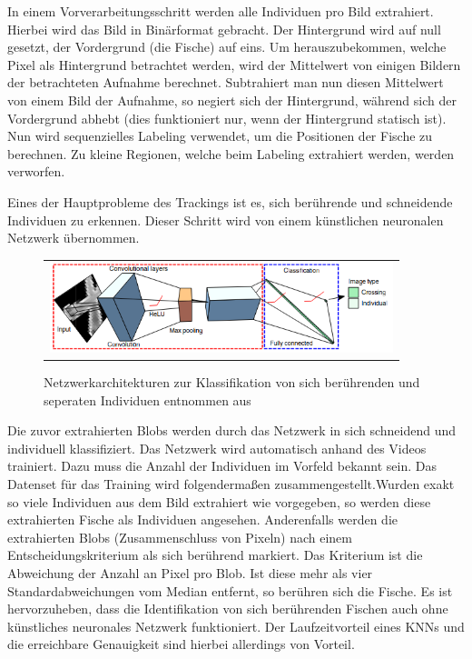 In einem Vorverarbeitungsschritt werden alle Individuen pro Bild extrahiert. Hierbei wird das Bild in Binärformat gebracht. Der Hintergrund wird auf null gesetzt, der Vordergrund (die Fische) auf eins.
Um herauszubekommen, welche Pixel als Hintergrund betrachtet werden, wird der Mittelwert von einigen Bildern der betrachteten Aufnahme berechnet. Subtrahiert man nun diesen Mittelwert von einem Bild der Aufnahme, so negiert sich der Hintergrund, während sich der Vordergrund abhebt (dies funktioniert nur, wenn der Hintergrund statisch ist).
Nun wird sequenzielles Labeling verwendet, um die Positionen der Fische zu berechnen. Zu kleine Regionen, welche beim Labeling extrahiert werden, werden verworfen.

Eines der Hauptprobleme des Trackings ist es, sich berührende und schneidende Individuen zu erkennen.
Dieser Schritt wird von einem künstlichen neuronalen Netzwerk übernommen.

\begin{figure}[H]
\centering
\begin{tabular}{l}
\includegraphics[width=100mm]{figures/Forschung/Individueen.png} 
\end{tabular}
\caption{ Netzwerkarchitekturen zur Klassifikation von sich berührenden und seperaten Individuen  \label{fig:tracking} entnommen aus \citet{DBLP:journals/corr/abs-1803-04351}}
\end{figure}

Die zuvor extrahierten Blobs werden durch das Netzwerk in sich schneidend und individuell klassifiziert.
Das Netzwerk wird automatisch anhand des Videos trainiert. Dazu muss die Anzahl der Individuen im Vorfeld bekannt sein. Das Datenset für das Training wird folgendermaßen zusammengestellt.Wurden exakt so viele Individuen aus dem Bild extrahiert wie vorgegeben, so werden diese extrahierten Fische als Individuen angesehen. Anderenfalls werden die extrahierten Blobs (Zusammenschluss von Pixeln) nach einem Entscheidungskriterium als sich berührend markiert. Das Kriterium ist die Abweichung der Anzahl an Pixel pro Blob. Ist diese mehr als vier Standardabweichungen vom Median entfernt, so berühren sich die Fische.
Es ist hervorzuheben, dass die Identifikation von sich berührenden Fischen auch ohne künstliches neuronales Netzwerk funktioniert. Der Laufzeitvorteil eines KNNs und die erreichbare Genauigkeit sind hierbei allerdings von Vorteil.

